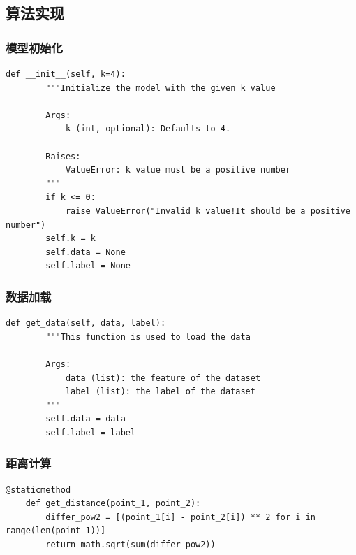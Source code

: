 \documentclass[utf-8]{article}
\begin{document}
\subsection{算法实现}
\subsubsection{模型初始化}
\begin{lstlisting}[style = python]
	def __init__(self, k=4):
        """Initialize the model with the given k value

        Args:
            k (int, optional): Defaults to 4.

        Raises:
            ValueError: k value must be a positive number
        """
        if k <= 0:
            raise ValueError("Invalid k value!It should be a positive number")
        self.k = k
        self.data = None
        self.label = None
\end{lstlisting}

\subsubsection{数据加载}
\begin{lstlisting}[style = python]
	def get_data(self, data, label):
        """This function is used to load the data

        Args:
            data (list): the feature of the dataset
            label (list): the label of the dataset
        """
        self.data = data
        self.label = label
\end{lstlisting}

\subsubsection{距离计算}
\begin{lstlisting}[style = python]
	@staticmethod
    def get_distance(point_1, point_2):
        differ_pow2 = [(point_1[i] - point_2[i]) ** 2 for i in range(len(point_1))]
        return math.sqrt(sum(differ_pow2))
\end{lstlisting}
\end{document}
